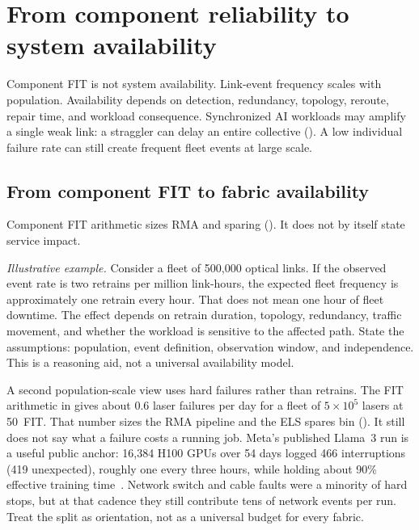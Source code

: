 \section{From component reliability to system availability}
\label{sec:networking-availability}

Component FIT is not system availability. Link-event
frequency scales with population. Availability depends on detection,
redundancy, topology, reroute, repair time, and workload consequence.
Synchronized AI workloads may amplify a single weak link: a
straggler can delay an entire collective
(). A low individual failure rate can still create
frequent fleet events at large scale.

\subsection{From component FIT to fabric availability}
\label{sec:fabric-availability}

Component FIT arithmetic sizes RMA and sparing
(). It does not by itself state service
impact.

\textit{Illustrative example.} Consider a fleet of 500{,}000 optical links. If
the observed event rate is two retrains per million link-hours, the expected
fleet frequency is approximately one retrain every hour. That does not mean one
hour of fleet downtime. The effect depends on retrain duration, topology,
redundancy, traffic movement, and whether the workload is sensitive to the
affected path. State the assumptions: population, event definition, observation
window, and independence. This is a reasoning aid, not a universal availability
model.

A second population-scale view uses hard failures rather than retrains. The FIT
arithmetic in  gives about $0.6$ laser failures per day
for a fleet of $5\times10^5$ lasers at 50~FIT. That number sizes the RMA
pipeline and the ELS spares bin (). It still does not say what
a failure costs a running job. Meta's published Llama~3 run is a useful public
anchor: 16{,}384 H100 GPUs over 54 days logged 466 interruptions (419
unexpected), roughly one every three hours, while holding about 90\% effective
training time~. Network switch and cable faults were a
minority of hard stops, but at that cadence they still contribute tens of
network events per run. Treat the split as orientation, not as a universal
budget for every fabric.

